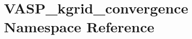 \hypertarget{namespace_v_a_s_p__kgrid__convergence}{\section{V\+A\+S\+P\+\_\+kgrid\+\_\+convergence Namespace Reference}
\label{namespace_v_a_s_p__kgrid__convergence}
}

